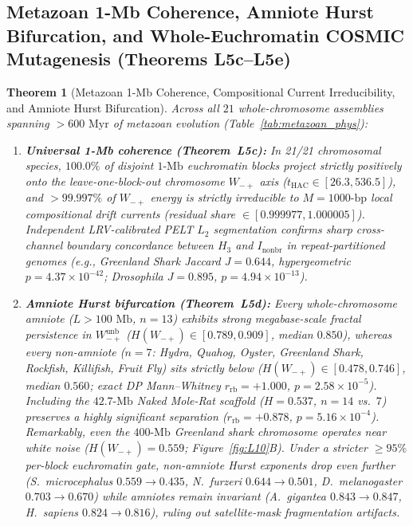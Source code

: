 \documentclass[11pt,a4paper]{article}
\renewcommand{\_}{\origunderscore\penalty200\relax}
\newtheorem{theorem}{Theorem}[section]
\theoremstyle{remark}
\begin{document}
\subsection{Metazoan 1-Mb Coherence, Amniote Hurst Bifurcation, and Whole-Euchromatin COSMIC Mutagenesis (Theorems L5c--L5e)}
\begin{theorem}[Metazoan 1-Mb Coherence, Compositional Current Irreducibility, and Amniote Hurst Bifurcation]
\label{thm:L5cd}
Across all $21$ whole-chromosome assemblies spanning $>600\text{ Myr}$ of metazoan evolution (Table~\ref{tab:metazoan_phys}):
\begin{enumerate}
  \item \textbf{Universal 1-Mb coherence (Theorem~L5c):} In 21/21 chromosomal species, $100.0\%$ of disjoint $1\text{-Mb}$ euchromatin blocks project strictly positively onto the leave-one-block-out chromosome $W_{-+}$ axis ($t_{\mathrm{HAC}} \in [26.3, 536.5]$), and $>99.997\%$ of $W_{-+}$ energy is strictly irreducible to $M=1000\text{-bp}$ local compositional drift currents (residual share $\in [0.999977, 1.000005]$). Independent LRV-calibrated PELT $L_2$ segmentation \cite{Killick2012} confirms sharp cross-channel boundary concordance between $H_3$ and $I_{\mathrm{nonbr}}$ in repeat-partitioned genomes (e.g., Greenland Shark Jaccard $J = 0.644$, hypergeometric $p = 4.37 \times 10^{-42}$; \textit{Drosophila} $J = 0.895$, $p = 4.94 \times 10^{-13}$).
  \item \textbf{Amniote Hurst bifurcation (Theorem~L5d):} Every whole-chromosome amniote ($L > 100\text{ Mb}$, $n=13$) exhibits strong megabase-scale fractal persistence in $W_{-+}^{\mathrm{unb}}$ ($H(W_{-+}) \in [0.789, 0.909]$, median $0.850$), whereas every non-amniote ($n=7$: Hydra, Quahog, Oyster, Greenland Shark, Rockfish, Killifish, Fruit Fly) sits strictly below ($H(W_{-+}) \in [0.478, 0.746]$, median $0.560$; exact DP Mann--Whitney $r_{\mathrm{rb}} = +1.000$, $p = 2.58 \times 10^{-5}$). Including the $42.7\text{-Mb}$ Naked Mole-Rat scaffold ($H=0.537$, $n=14$ vs.\ $7$) preserves a highly significant separation ($r_{\mathrm{rb}} = +0.878$, $p = 5.16 \times 10^{-4}$). Remarkably, even the $400\text{-Mb}$ Greenland shark chromosome operates near white noise ($H(W_{-+}) = 0.559$; Figure~\ref{fig:L10}B). Under a stricter $\ge 95\%$ per-block euchromatin gate, non-amniote Hurst exponents drop even further (\textit{S.\ microcephalus} $0.559\to 0.435$, \textit{N.\ furzeri} $0.644\to 0.501$, \textit{D.\ melanogaster} $0.703\to 0.670$) while amniotes remain invariant (\textit{A.\ gigantea} $0.843\to 0.847$, \textit{H.\ sapiens} $0.824\to 0.816$), ruling out satellite-mask fragmentation artifacts.

\end{enumerate}
\end{theorem}
\end{document}
